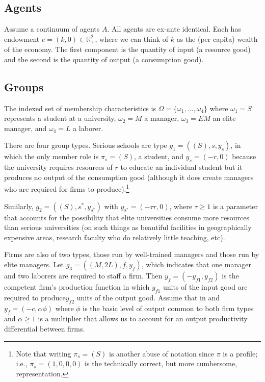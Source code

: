 \documentclass[12pt,letterpaper]{article}
\begin{document}
	\subsection{Agents}
	Assume a continuum of agents $A$. 
	All agents are ex-ante identical. 
	Each has endowment $e=(k,0)\in\mathbb{R}^2_+$, where we can think of $k$ as the (per capita) wealth of the economy.
	The first component is the quantity of input (a resource good) and the second is the quantity of output (a consumption good).
	
	\subsection{Groups}
	The indexed set of membership characteristics is  $\Omega=\{\omega_1,\ldots,\omega_4\}$ where  $\omega_1=S$ represents a student at a university, $\omega_2=M$ a manager, $\omega_3=EM$ an elite manager, and $\omega_4=L$ a laborer.
	
	There are four group types. 
	Serious schools are type $g_1=((S),s,y_s)$, in which the only member role is $\pi_s=(S)$, a student, and $y_s=(-r,0)$ because the university requires resources of $r$ to educate an individual student but it produces no output of the consumption good (although it does create managers who are required for firms to produce).\footnote
	{
		Note that writing $\pi_s=(S)$ is another abuse of notation since $\pi$ is a profile; i.e., $\pi_s=(1,0,0,0)$ is the technically correct, but more cumbersome, representation.
	}
	
	Similarly, $g_2=((S),s^\ast,y_{s^\ast})$ with  $y_{s^\ast}=(-\tau r,0)$, where $\tau\ge 1$ is a parameter that accounts for the possibility that elite universities consume more resources than serious universities (on such things as beautiful facilities in geographically expensive areas, research faculty who do relatively little teaching, etc).
	
	Firms are also of two types, those run by well-trained managers and those run by elite managers.
	Let $g_3=((M,2L),f,y_f)$, which indicates that one manager and two laborers are required to staff a firm.
	Then $y_f=(-y_{f1},y_{f2})$ is the competent firm's production function in which $y_{f1}$ units of the input good are required to produce$y_{f2}$ units of the output good.
	Assume that in and $y_f=(-c,\alpha\phi)$ where $\phi$ is the basic level of output common to both firm types and $\alpha\ge 1$ is a multiplier that allows us to account for an output productivity differential between firms.
	
\end{document}
